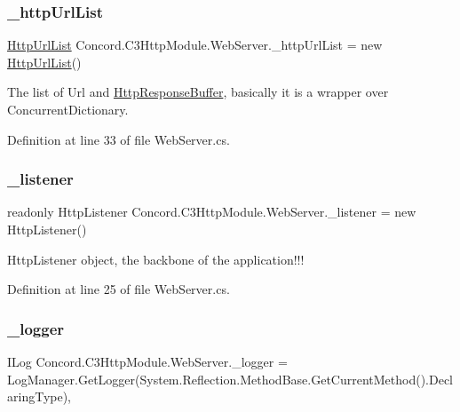 \subsubsection{\texorpdfstring{\_httpUrlList}{\_httpUrlList}}
{\footnotesize\ttfamily \mbox{\hyperlink{class_concord_1_1_c3_http_module_1_1_http_url_list}{Http\+Url\+List}} Concord.\+C3\+Http\+Module.\+Web\+Server.\+\_\+http\+Url\+List = new \mbox{\hyperlink{class_concord_1_1_c3_http_module_1_1_http_url_list}{Http\+Url\+List}}()\hspace{0.3cm}{\ttfamily [private]}}



The list of Url and \mbox{\hyperlink{class_concord_1_1_c3_http_module_1_1_http_response_buffer}{Http\+Response\+Buffer}}, basically it is a wrapper over Concurrent\+Dictionary. 



Definition at line 33 of file Web\+Server.\+cs.

\mbox{\label{class_concord_1_1_c3_http_module_1_1_web_server_a9fcf48705c4fba563e06f29fbea6c803}} 
\subsubsection{\texorpdfstring{\_listener}{\_listener}}
{\footnotesize\ttfamily readonly Http\+Listener Concord.\+C3\+Http\+Module.\+Web\+Server.\+\_\+listener = new Http\+Listener()\hspace{0.3cm}{\ttfamily [private]}}



Http\+Listener object, the backbone of the application!!! 



Definition at line 25 of file Web\+Server.\+cs.

\mbox{\label{class_concord_1_1_c3_http_module_1_1_web_server_a95e1f65ea64f11e550fd2a8fd41614e3}} 
\subsubsection{\texorpdfstring{\_logger}{\_logger}}
{\footnotesize\ttfamily I\+Log Concord.\+C3\+Http\+Module.\+Web\+Server.\+\_\+logger = Log\+Manager.\+Get\+Logger(System.\+Reflection.\+Method\+Base.\+Get\+Current\+Method().Declaring\+Type)\hspace{0.3cm}{\ttfamily [static]}, {\ttfamily [private]}}



